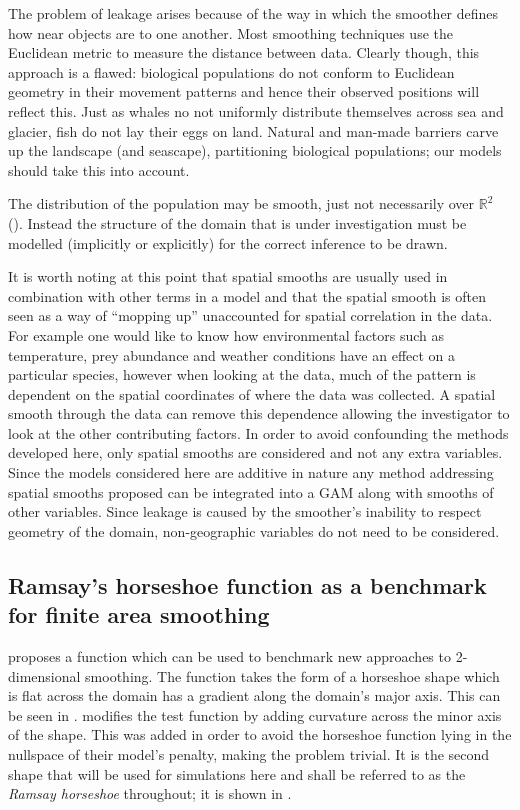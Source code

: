The problem of leakage arises because of the way in which the smoother defines how near objects are to one another. Most smoothing techniques use the Euclidean metric to measure the distance between data. Clearly though, this approach is a flawed: biological populations do not conform to Euclidean geometry in their movement patterns and hence their observed positions will reflect this. Just as whales no not uniformly distribute themselves across sea and glacier, fish do not lay their eggs on land. Natural and man-made barriers carve up the landscape (and seascape), partitioning biological populations; our models should take this into account.

The distribution of the population may be smooth, just not necessarily over $\mathbb{R}^2$ (\cite{wangranalli}). Instead the structure of the domain that is under investigation must be modelled (implicitly or explicitly) for the correct inference to be drawn.

It is worth noting at this point that spatial smooths are usually used in combination with other terms in a model and that the spatial smooth is often seen as a way of ``mopping up'' unaccounted for spatial correlation in the data. For example one would like to know how environmental factors such as temperature, prey abundance and weather conditions have an effect on a particular species, however when looking at the data, much of the pattern is dependent on the spatial coordinates of where the data was collected. A spatial smooth through the data can remove this dependence allowing the investigator to look at the other contributing factors. In order to avoid confounding the methods developed here, only spatial smooths are considered and not any extra variables. Since the models considered here are additive in nature any method addressing spatial smooths proposed can be integrated into a GAM along with smooths of other variables. Since leakage is caused by the smoother's inability to respect geometry of the domain, non-geographic variables do not need to be considered.

\subsection{Ramsay's horseshoe function as a benchmark for finite area smoothing}

\label{ramsayfunc}

 proposes a function which can be used to benchmark new approaches to 2-dimensional smoothing. The function takes the form of a horseshoe shape which is flat across the domain has a gradient along the domain's major axis. This can be seen in .  modifies the test function by adding curvature across the minor axis of the shape. This was added in order to avoid the horseshoe function lying in the nullspace of their model's penalty, making the problem trivial. It is the second shape that will be used for simulations here and shall be referred to as the \emph{Ramsay horseshoe} throughout; it is shown in .

